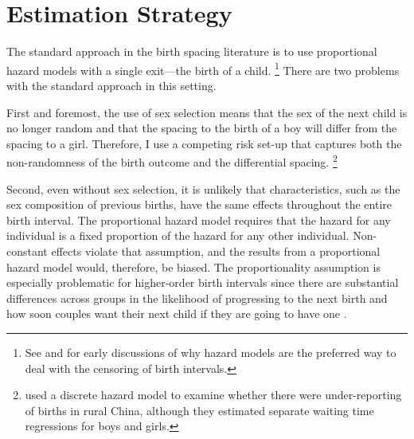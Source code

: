 \documentclass[12pt,letterpaper]{article}
\begin{document}

\section{Estimation Strategy\label{sec:strategy}}


The standard approach in the birth spacing literature is to use proportional hazard
models with a single exit---the birth of a child.%
\footnote{
See \citet{Sheps1970} and \citet{Newman1984} for early discussions of why 
hazard models are the preferred way to deal with the censoring of birth
intervals.
}
There are two problems with the standard approach in this setting.

First and foremost, the use of sex selection means that the sex of the next child is 
no longer random and that the spacing to the birth of a boy will differ from the 
spacing to a girl. 
Therefore, I use a competing risk set-up that captures both the non-randomness of 
the birth outcome and the differential spacing.%
\footnote{
\cite{Merli2000} used a discrete hazard model to examine whether 
there were under-reporting of births in rural China, although they 
estimated separate waiting time regressions for boys and girls.
}

Second, even without sex selection, it is unlikely that characteristics, such as 
the sex composition of previous births, have the same effects throughout the entire 
birth interval. 
The proportional hazard model requires that the hazard for any individual is a 
fixed proportion of the hazard for any other individual. 
Non-constant effects violate that assumption, and the results from a proportional hazard 
model would, therefore, be biased. 
The proportionality assumption is especially problematic for higher-order birth 
intervals since there are substantial differences across groups in the likelihood 
of progressing to the next birth and how soon couples want their next child if they 
are going to have one \citep{Whitworth2002,Bhalotra2008,Kim2010}.
\end{document}
